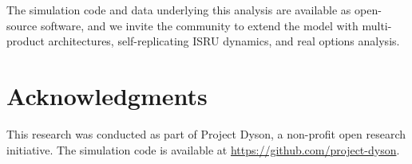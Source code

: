 \documentclass[preprint,12pt]{elsarticle}
\begin{document}
The simulation code and data underlying this analysis are available as open-source software, and we invite the community to extend the model with multi-product architectures, self-replicating ISRU dynamics, and real options analysis.


\section*{Acknowledgments}

This research was conducted as part of Project Dyson, a non-profit open research initiative. The simulation code is available at \url{https://github.com/project-dyson}.
\end{document}
